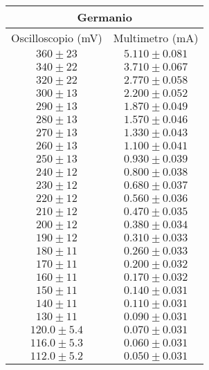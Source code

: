 \documentclass[@MAIN@]{subfile}
\begin{document}
\begin{tabular}{ ||c|c|| }
  \hline
  \multicolumn{2}{||c||}{Germanio}\\
  \hline
  Oscilloscopio (mV) & Multimetro (mA) \\
  \hline
  $360\pm 23$ & $5.110\pm 0.081$ \\
  \hline
  $340\pm 22$ & $3.710\pm 0.067$ \\
  \hline
  $320\pm 22$ & $2.770\pm 0.058$ \\
  \hline
  $300\pm 13$ & $2.200\pm 0.052$\\
  \hline
  $290\pm 13$ & $1.870\pm 0.049$ \\
  \hline
  $280\pm 13$ & $1.570\pm 0.046$ \\
  \hline
  $270\pm 13$ & $1.330\pm 0.043$ \\
  \hline
  $260\pm 13$ & $1.100\pm 0.041$ \\
  \hline
  $250\pm 13$ & $0.930\pm 0.039$ \\
  \hline
  $240\pm 12$ & $0.800\pm 0.038$ \\
  \hline
  $230\pm 12$ & $0.680\pm 0.037$ \\
  \hline 
  $220\pm 12$ & $0.560\pm 0.036$ \\
  \hline 
  $210\pm 12$ & $0.470\pm 0. 035$ \\
  \hline 
  $200\pm 12$ & $0.380\pm 0.034$ \\
  \hline 
  $190\pm 12$ & $0.310\pm 0.033$ \\
  \hline 
  $180\pm 11$ & $0.260\pm 0.033$ \\
  \hline 
  $170\pm 11$ & $0.200\pm 0.032$ \\
  \hline 
  $160\pm 11$ & $0.170\pm 0.032$ \\
  \hline 
  $150\pm 11$ & $0.140\pm 0.031$ \\
  \hline 
  $140\pm 11$ & $0.110\pm 0.031$ \\
  \hline 
  $130\pm 11$ & $0.090\pm 0.031$ \\
  \hline 
  $120.0\pm 5.4$ & $0.070\pm 0.031$ \\
  \hline 
  $116.0\pm 5.3$ & $0.060\pm 0.031$ \\
  \hline 
  $112.0\pm 5.2$ & $0.050\pm 0.031$ \\
  \hline 
 
\end{tabular}   
 
\end{document}
